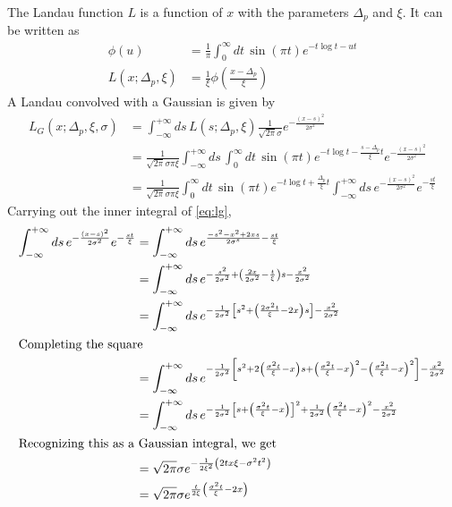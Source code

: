 \documentclass[11pt]{article}
\begin{document}
The Landau function $L$ is a function of $x$ with the parameters
$\Delta_p$ and $\xi$.  It can be written as 
\begin{align}
  \phi(u) &= \frac1\pi\int_0^\infty dt\,\sin(\pi t) e^{-t\log{t}-ut}
  \label{eq:phi}\\
  L(x;\Delta_p,\xi) &= \frac1\xi
  \phi\left(\frac{x-\Delta_p}{\xi}\right)\label{eq:land} 
\end{align}
A Landau convolved with a Gaussian is given by 
\begin{align}
  L_{G}(x;\Delta_p,\xi,\sigma) &= \int_{-\infty}^{+\infty}
  ds\, L(s;\Delta_p,\xi) \frac{1}{\sqrt{2\pi}\sigma}
  e^{-\frac{(x-s)^2}{2\sigma^2}}\nonumber\\
  &=
  \frac{1}{\sqrt{2\pi}\sigma\pi\xi}\int_{-\infty}^{+\infty}ds\,\int_0^\infty
  dt\,\sin(\pi t)e^{-t\log{t}-\frac{s-\Delta_p}{\xi}t}
  e^{-\frac{(x-s)^2}{2\sigma^2}}\nonumber\\
  &= \frac{1}{\sqrt{2\pi}\sigma\pi\xi}\int_0^\infty
  dt\,\sin(\pi t) e^{-t\log{t}+\frac{\Delta_p}{\xi}t}\int_{-\infty}^{+\infty}
  ds\,e^{-\frac{(x-s)^2}{2\sigma^2}}e^{-\frac{st}{\xi}}\label{eq:lg}
\end{align}
Carrying out the inner integral of \eqref{eq:lg}, 
\begin{align}
  \int_{-\infty}^{+\infty}
  ds\,e^{-\frac{(x-s)^2}{2\sigma^2}}e^{-\frac{st}{\xi}} &=
  \int_{-\infty}^{+\infty}
  ds\,e^{\frac{-s^2-x^2+2xs}{2\sigma^s}-\frac{st}{\xi}}\nonumber\\
  &= \int_{-\infty}^{+\infty}
  ds\,e^{-\frac{s^2}{2\sigma^2}+\left(\frac{2x}{2\sigma^2}-\frac{t}{\xi}\right)s-\frac{x^2}{2\sigma^2}}\nonumber\\
  &= \int_{-\infty}^{+\infty}
  ds\,e^{-\frac{1}{2\sigma^2}\left[s^2+\left(\frac{2\sigma^2t}{\xi}-2x\right)s\right]-\frac{x^2}{2\sigma^2}}\nonumber\\
  \intertext{Completing the square} 
  &= \int_{-\infty}^{+\infty}
  ds\,e^{-\frac{1}{2\sigma^2}\left[s^2+2\left(\frac{\sigma^2t}{\xi}-x\right)s
      +\left(\frac{\sigma^2t}{\xi}-x\right)^2
      -\left(\frac{\sigma^2t}{\xi}-x\right)^2\right]-\frac{x^2}{2\sigma^2}}\nonumber\\
  &= \int_{-\infty}^{+\infty}
  ds\,e^{-\frac{1}{2\sigma^2}\left[s + \left(\frac{\sigma^2t}{\xi}-x\right)\right]^2
    +\frac{1}{2\sigma^2}\left(\frac{\sigma^2t}{\xi}-x\right)^2
    -\frac{x^2}{2\sigma^2}}\nonumber\\
  \intertext{Recognizing this as a Gaussian integral, we get}
  &= \sqrt{2\pi}\sigma
   e^{-\frac{1}{2\xi^2}\left(2tx\xi-\sigma^2t^2\right)}\nonumber\\
   &= \sqrt{2\pi}\sigma e^{\frac{t}{2\xi}\left(\frac{\sigma^2t}{\xi}-2x\right)}
  \label{eq:inner}
\end{align}
\end{document}
